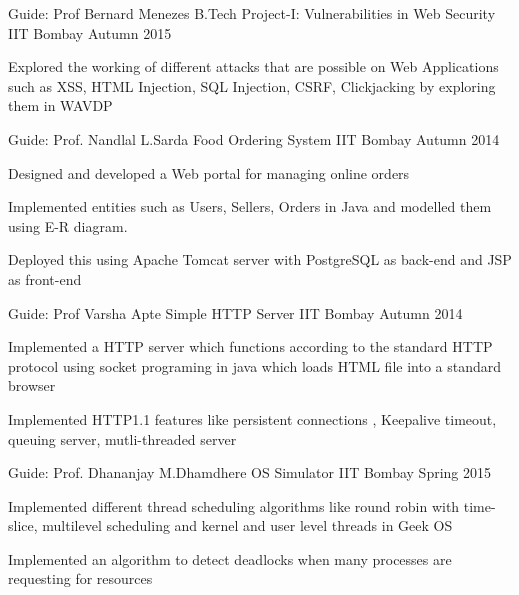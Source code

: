 \begin{cventries}
    
  \cventry
    {Guide: Prof Bernard Menezes}
    {B.Tech Project-I: Vulnerabilities in Web Security}
    {IIT Bombay}
    {Autumn 2015}
    {
      \begin{cvitems}
        \item {Explored the working of different attacks that are possible on Web Applications such as XSS, HTML
                Injection, SQL Injection, CSRF, Clickjacking by exploring them in WAVDP}
      \end{cvitems} 
    }
  \cventry
    {Guide: Prof. Nandlal L.Sarda}
    {Food Ordering System}
    {IIT Bombay}
    {Autumn 2014}
    {
      \begin{cvitems}
        \item {Designed and developed a Web portal for managing online orders}
        \item{Implemented entities such as Users, Sellers, Orders in Java and modelled them using E-R diagram.}
        \item{Deployed this using Apache Tomcat server with PostgreSQL as back-end and JSP as front-end}
      \end{cvitems}
    }
  \cventry
    {Guide: Prof Varsha Apte}
    {Simple HTTP Server}
    {IIT Bombay}
    {Autumn 2014}
    {
      \begin{cvitems}
        \item {Implemented a HTTP server which functions according to the standard HTTP protocol using socket
                programing in java which loads HTML file into a standard browser}
        \item{Implemented HTTP1.1 features like persistent connections , Keepalive timeout, queuing server,
            mutli-threaded server}
      \end{cvitems}
    }
  \cventry
    {Guide: Prof. Dhananjay M.Dhamdhere}
    {OS Simulator}
    {IIT Bombay}
    {Spring 2015}
    {
      \begin{cvitems}
        \item {Implemented different thread scheduling algorithms like round robin with time-slice, multilevel
                scheduling and kernel and user level threads in Geek OS}
        \item {Implemented an algorithm to detect deadlocks when many processes are requesting for resources}
      \end{cvitems}
}
\end{cventries}

